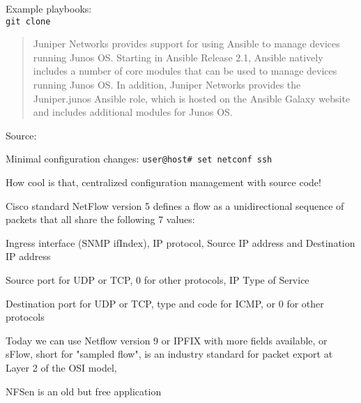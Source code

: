 \documentclass[Screen16to9,17pt]{foils}
\begin{document}
Example playbooks:\\
\verb+git clone +




\begin{quote}
  Juniper Networks provides support for using Ansible to manage devices running Junos OS. Starting in Ansible Release 2.1, Ansible natively includes a number of core modules that can be used to manage devices running Junos OS. In addition, Juniper Networks provides the Juniper.junos Ansible role, which is hosted on the Ansible Galaxy website and includes additional modules for Junos OS.
\end{quote}
Source:{\footnotesize
{}}

\begin{list2}
\item Minimal configuration changes: \verb+user@host# set netconf ssh+
\end{list2}

How cool is that, centralized configuration management with source code!



\begin{slidelist}
\item Cisco standard NetFlow version 5 defines a flow as a unidirectional sequence of packets that all share the following 7 values:
\begin{list2}
\item Ingress interface (SNMP ifIndex), IP protocol, Source IP address and Destination IP address
\item Source port for UDP or TCP, 0 for other protocols, IP Type of Service
\item Destination port for UDP or TCP, type and code for ICMP, or 0 for other protocols
\end{list2}
\item Today we can use Netflow version 9 or IPFIX with more fields available, or  sFlow, short for "sampled flow", is an industry standard for packet export at Layer 2 of the OSI model, \\
\item NFSen is an old but free application
\end{slidelist}
\end{document}

